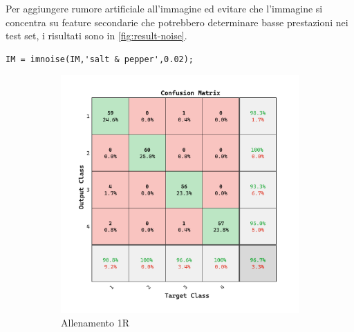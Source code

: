 Per aggiungere rumore artificiale all'immagine ed evitare che l'immagine si concentra su feature secondarie che potrebbero determinare basse prestazioni nei test set, i risultati sono in \cref{fig:result-noise}.

\begin{lstlisting}
IM = imnoise(IM,'salt & pepper',0.02);
\end{lstlisting}

\begin{figure}[ht]
    \centering
    \begin{subfigure}{0.45\textwidth}
        \includegraphics[width=\textwidth]{addestramento-rete-neurale/one-noise.pdf}
        \caption{Allenamento 1R} 
    \end{subfigure}
    \begin{subfigure}{0.45\textwidth}

\end{subfigure}
\end{figure}

